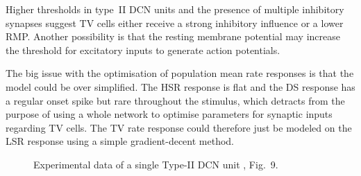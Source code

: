 Higher thresholds in type~II DCN units \citep{SpirouDavisEtAl:1999} and the
presence of multiple inhibitory synapses \citep{Alibardi:2006} suggest TV cells
either receive a strong inhibitory influence or a lower RMP\@. Another possibility
is that the resting membrane potential may increase the threshold for excitatory
inputs to generate action potentials.


The big issue with the optimisation of population mean rate responses is that
the model could be over simplified.  The HSR response is flat and the DS
response has a regular onset spike but rare throughout the stimulus, which
detracts from the purpose of using a whole network to optimise parameters for
synaptic inputs regarding TV cells.  The TV rate response could therefore just
be modeled on the LSR response using a simple gradient-decent
method. 
 


\begin{figure}[htb]
  \centering
  \caption{Experimental data of a single Type-II DCN unit
    \citep{ReissYoung:2005}, Fig.~9.}
  \label{fig:TVReissFig9}
\end{figure}

